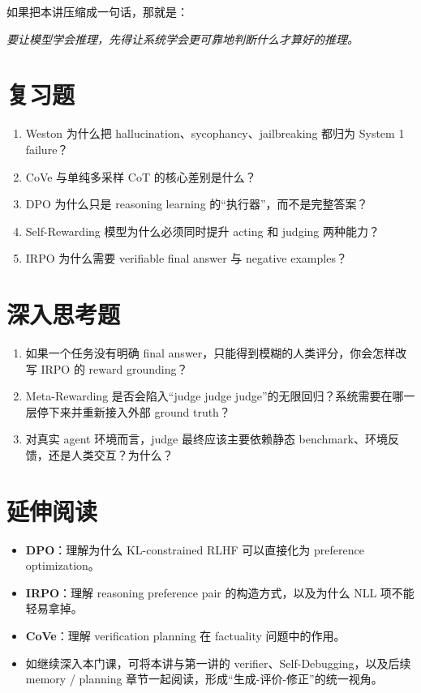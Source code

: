 如果把本讲压缩成一句话，那就是：
\begin{center}
\emph{要让模型学会推理，先得让系统学会更可靠地判断什么才算好的推理。}
\end{center}

\section{复习题}

\begin{enumerate}
\item Weston 为什么把 hallucination、sycophancy、jailbreaking 都归为 System 1 failure？
\item CoVe 与单纯多采样 CoT 的核心差别是什么？
\item DPO 为什么只是 reasoning learning 的“执行器”，而不是完整答案？
\item Self-Rewarding 模型为什么必须同时提升 acting 和 judging 两种能力？
\item IRPO 为什么需要 verifiable final answer 与 negative examples？
\end{enumerate}

\section{深入思考题}

\begin{enumerate}
\item 如果一个任务没有明确 final answer，只能得到模糊的人类评分，你会怎样改写 IRPO 的 reward grounding？
\item Meta-Rewarding 是否会陷入“judge judge judge”的无限回归？系统需要在哪一层停下来并重新接入外部 ground truth？
\item 对真实 agent 环境而言，judge 最终应该主要依赖静态 benchmark、环境反馈，还是人类交互？为什么？
\end{enumerate}

\section{延伸阅读}

\begin{itemize}
\item \textbf{DPO}：理解为什么 KL-constrained RLHF 可以直接化为 preference optimization。
\item \textbf{IRPO}：理解 reasoning preference pair 的构造方式，以及为什么 NLL 项不能轻易拿掉。
\item \textbf{CoVe}：理解 verification planning 在 factuality 问题中的作用。
\item 如继续深入本门课，可将本讲与第一讲的 verifier、Self-Debugging，以及后续 memory / planning 章节一起阅读，形成“生成-评价-修正”的统一视角。
\end{itemize}
